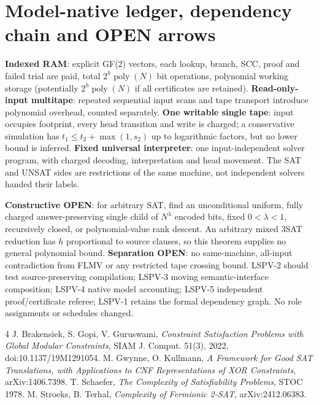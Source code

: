 \documentclass[11pt]{article}
\begin{document}
\section{Model-native ledger, dependency chain and OPEN arrows}
\textbf{Indexed RAM}: explicit GF(2) vectors, each lookup, branch, SCC, proof and failed trial are paid, total $2^h\operatorname{poly}(N)$ bit operations, polynomial working storage (potentially $2^h\operatorname{poly}(N)$ if all certificates are retained). \textbf{Read-only-input multitape}: repeated sequential input scans and tape transport introduce polynomial overhead, counted separately. \textbf{One writable single tape}: input occupies footprint, every head transition and write is charged; a conservative simulation has $t_1\le t_2+\max(1,s_2)$ up to logarithmic factors, but no lower bound is inferred. \textbf{Fixed universal interpreter}: one input-independent solver program, with charged decoding, interpretation and head movement. The SAT and UNSAT sides are restrictions of the same machine, not independent solvers handed their labels.

\textbf{Constructive OPEN}: for arbitrary SAT, find an unconditional uniform, fully charged answer-preserving single child of $N^\lambda$ encoded bits, fixed $0<\lambda<1$, recursively closed, or polynomial-value rank descent. An arbitrary mixed 3SAT reduction has $h$ proportional to source clauses, so this theorem supplies no general polynomial bound.
\textbf{Separation OPEN}: no same-machine, all-input contradiction from FLMV or any restricted tape crossing bound. LSPV-2 should test source-preserving compilation; LSPV-3 moving semantic-interface composition; LSPV-4 native model accounting; LSPV-5 independent proof/certificate referee; LSPV-1 retains the formal dependency graph. No role assignments or schedules changed.

\begin{thebibliography}{4}
 J. Brakensiek, S. Gopi, V. Guruswami, \emph{Constraint Satisfaction Problems with Global Modular Constraints}, SIAM J. Comput. 51(3), 2022, doi:10.1137/19M1291054.
 M. Gwynne, O. Kullmann, \emph{A Framework for Good SAT Translations, with Applications to CNF Representations of XOR Constraints}, arXiv:1406.7398.
 T. Schaefer, \emph{The Complexity of Satisfiability Problems}, STOC 1978.
 M. Stroeks, B. Terhal, \emph{Complexity of Fermionic 2-SAT}, arXiv:2412.06383.
\end{thebibliography}
\end{document}
